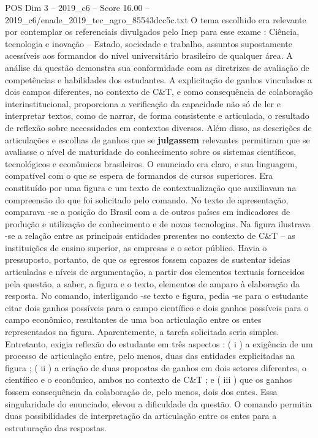 \begin{textsample}{POS Dim 3 – 2019\_c6 – Score 16.00 – 2019\_c6/enade\_2019\_tec\_agro\_85543dcc5c.txt}
O tema escolhido era relevante por contemplar os referenciais divulgados pelo Inep para esse exame : Ciência, tecnologia e inovação – Estado, sociedade e trabalho, assuntos supostamente acessíveis aos formandos do nível universitário brasileiro de qualquer área.
A análise da questão demonstra sua conformidade com as diretrizes de avaliação de competências e habilidades dos estudantes.
A explicitação de ganhos vinculados a dois campos diferentes, no contexto de C\&T, e como consequência de colaboração interinstitucional, proporciona a verificação da capacidade não só de ler e interpretar textos, como de narrar, de forma consistente e articulada, o resultado de reflexão sobre necessidades em contextos diversos.
Além disso, as descrições de articulações e escolhas de ganhos que se \textbf{julgassem} relevantes permitiram que se avaliasse o nível de maturidade do conhecimento sobre os sistemas científicos, tecnológicos e econômicos brasileiros.
O enunciado era claro, e sua linguagem, compatível com o que se espera de formandos de cursos superiores.
Era constituído por uma figura e um texto de contextualização que auxiliavam na compreensão do que foi solicitado pelo comando.
No texto de apresentação, comparava -se a posição do Brasil com a de outros países em indicadores de produção e utilização de conhecimento e de novas tecnologias.
Na figura ilustrava -se a relação entre as principais entidades presentes no contexto de C\&T – as instituições de ensino superior, as empresas e o setor público.
Havia o pressuposto, portanto, de que os egressos fossem capazes de sustentar ideias articuladas e níveis de argumentação, a partir dos elementos textuais fornecidos pela questão, a saber, a figura e o texto, elementos de amparo à elaboração da resposta.
No comando, interligando -se texto e figura, pedia -se para o estudante citar dois ganhos possíveis para o campo científico e dois ganhos possíveis para o campo econômico, resultantes de uma boa articulação entre os entes representados na figura.
Aparentemente, a tarefa solicitada seria simples.
Entretanto, exigia reflexão do estudante em três aspectos : ( i ) a exigência de um processo de articulação entre, pelo menos, duas das entidades explicitadas na figura ; ( ii ) a criação de duas propostas de ganhos em dois setores diferentes, o científico e o econômico, ambos no contexto de C\&T ; e ( iii ) que os ganhos fossem consequência da colaboração de, pelo menos, dois dos entes.
Essa singularidade do enunciado, elevou a dificuldade da questão.
O comando permitia duas possibilidades de interpretação da articulação entre os entes para a estruturação das respostas.

\end{textsample}
